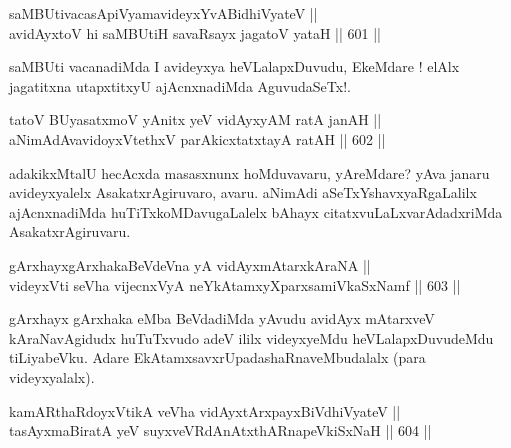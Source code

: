 
\begin{shl}
saMBUtivacasA\s piVyamavideyxYvABidhiVyateV ||  \\
avidAyxtoV hi saMBUtiH savaRsayx jagatoV yataH \hfill || 601 ||  
\end{shl}

\begin{artha}
saMBUti vacanadiMda I avideyxya heVLalapxDuvudu, EkeMdare !
elAlx jagatitxna utapxtitxyU ajAcnxnadiMda AguvudaSeTx!.
\end{artha}


\begin{shl}
tatoV BUyasatxmoV yAnitx yeV vidAyxyAM ratA janAH || \\
aNimAdAvavidoyxVtethxV parAkicxtatxtayA ratAH \hfill || 602 ||  
\end{shl}

\begin{artha}
adakikxMtalU hecAcxda masasxnunx hoMduvavaru, yAreMdare? yAva janaru avideyxyalelx AsakatxrAgiruvaro, avaru. aNimAdi
aSeTxYshavxyaRgaLalilx ajAcnxnadiMda huTiTxkoMDavugaLalelx bAhayx citatxvuLaLxvarAdadxriMda AsakatxrAgiruvaru.
\end{artha}


\begin{shl}
gArxhayxgArxhakaBeVdeVna yA vidAyxmAtarxkAraNA || \\
videyxVti seVha vijecnxVyA neYkAtamxyXparxsamiVkaSxNamf ||  603  ||  
\end{shl}

\begin{artha}
gArxhayx gArxhaka eMba BeVdadiMda yAvudu avidAyx mAtarxveV
kAraNavAgidudx huTuTxvudo adeV ililx videyxyeMdu heVLalapxDuvudeMdu
tiLiyabeVku. Adare EkAtamxsavxrUpadashaRnaveMbudalalx (para
videyxyalalx).
\end{artha}


\begin{shl}
kamARthaRdoyxVtikA veVha vidAyx\s tArxpayxBiVdhiVyateV || \\
tasAyxmaBiratA yeV suyxveVRdAnAtxthARnapeVkiSxNaH \hfill || 604 ||  
\end{shl}

